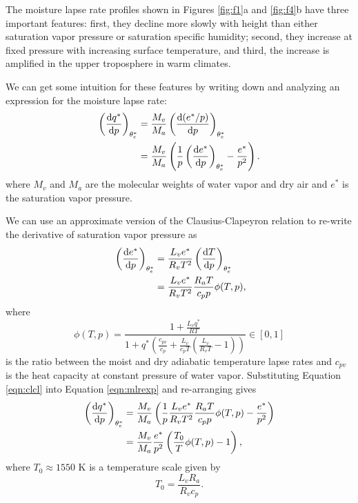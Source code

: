\documentclass[twocol]{ametsoc}
\begin{document}
\appendix[A]
\label{app:moisture_lapse_rate}

The moisture lapse rate profiles shown in Figures \ref{fig:f1}a and \ref{fig:f4}b have three important features: first, they decline more slowly with height than either saturation vapor pressure or saturation specific humidity; second, they increase at fixed pressure with increasing surface temperature, and third, the increase is amplified in the upper troposphere in warm climates.

We can get some intuition for these features by writing down and analyzing an expression for the moisture lapse rate:
\begin{equation} \label{eqn:mlrexp}
\begin{split}
	\left(\frac{{\rm d}q^*}{{\rm d}p}\right)_{\theta_e^*} &= \frac{M_v}{M_a}\left(\frac{{\rm d}(e^*/p)}{{\rm d}p}\right)_{\theta_e^*} \\
	&= \frac{M_v}{M_a} \left ( \frac{1}{p} \left(\frac{{\rm d}e^*}{{\rm d}p}\right)_{\theta_e^*} - \frac{e^*}{p^2} \right ).
\end{split}
\end{equation}
where $M_v$ and $M_a$ are the molecular weights of water vapor and dry air and $e^*$ is the saturation vapor pressure.

We can use an approximate version of the Clausius-Clapeyron relation \citep[][]{Pierrehumbert2010PrinciplesClimate} to re-write the derivative of saturation vapor pressure as
\begin{equation} \label{eqn:clcl}
\begin{split}
\    	\left(\frac{{\rm d}e^*}{{\rm d}p}\right)_{\theta_e^*} &= \frac{L_v e^*}{R_v T^2} \left(\frac{{\rm d}T}{{\rm d}p}\right)_{\theta_e^*} \\
	&= \frac{L_v e^*}{R_v T^2} \frac{R_a T}{c_p p} \phi(T,p),
\end{split}
\end{equation}
where 
\begin{equation}
    \phi(T,p) = \frac{1 + \frac{L_v q^*}{R T}}{1 + q^* \left (\frac{c_{pv}}{c_p} + \frac{L_v}{c_p T}\left( \frac{L_v}{R_v T} - 1\right) \right)} \in [0,1]
\end{equation}
is the ratio between the moist and dry adiabatic temperature lapse rates \citep[e.g.][]{Pierrehumbert2010PrinciplesClimate} and $c_{pv}$ is the heat capacity at constant pressure of water vapor. Substituting Equation \ref{eqn:clcl} into Equation \ref{eqn:mlrexp} and re-arranging gives
\begin{equation} \label{eqn:mlr}
\begin{split}
	\left(\frac{{\rm d}q^*}{{\rm d}p}\right)_{\theta_e^*} &= \frac{M_v}{M_a} \left ( \frac{1}{p} \frac{L_v e^*}{R_v T^2} \frac{R_a T}{c_p p} \phi(T,p) - \frac{e^*}{p^2} \right ) \\
	&= \frac{M_v}{M_a} \frac{e^*}{p^2} \left ( \frac{T_0}{T} \phi(T,p) - 1 \right ),
\end{split}
\end{equation}
where $T_0 \approx 1550$ K is a temperature scale given by
\begin{equation}
T_0 = \frac{L_v R_a}{R_v c_p}.
\end{equation}
\end{document}
